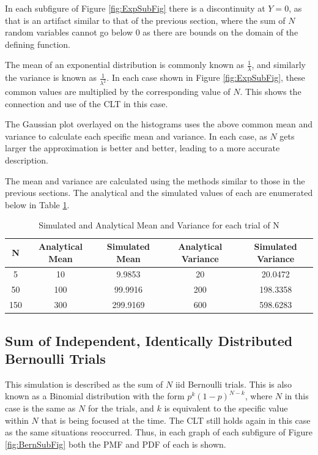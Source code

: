 \documentclass[a4paper, 11pt]{article}
\begin{document}
\noindent
In each subfigure of Figure \ref{fig:ExpSubFig} there is a discontinuity at \(Y = 0\), as that is an artifact similar to that of the previous section, where the sum of \(N\) random variables cannot go below \(0\) as there are bounds on the domain of the defining function.

\medskip
\noindent
The mean of an exponential distribution is commonly known as \(\displaystyle\frac{1}{\lambda}\), and similarly the variance is known as \(\displaystyle\frac{1}{\lambda^2}\). In each case shown in Figure \ref{fig:ExpSubFig}, these common values are multiplied by the corresponding value of \(N\).
This shows the connection and use of the CLT in this case.

\medskip
\noindent
The Gaussian plot overlayed on the histograms uses the above common mean and variance to calculate each specific mean and variance. In each case, as \(N\) gets larger the approximation is better and better, leading to a more accurate description.

\medskip
\noindent
The mean and variance are calculated using the methods similar to those in the previous sections. The analytical and the simulated values of each are enumerated below in Table \ref{tab:ExpTable}.

\begin{table}[htbp]
\caption{\label{tab:ExpTable}Simulated and Analytical Mean and Variance for each trial of N}
\centering
\begin{tabular}{|c|c|c|c|c|}
\hline
N & Analytical Mean & Simulated Mean & Analytical Variance & Simulated Variance\\
\hline
5 & 10 & 9.9853 & 20 & 20.0472\\
50 & 100 & 99.9916 & 200 & 198.3358\\
150 & 300 & 299.9169 & 600 & 598.6283\\
\hline
\end{tabular}
\end{table}



\subsection{Sum of Independent, Identically Distributed Bernoulli Trials}
\label{sec:org3bb145c}
This simulation is described as the sum of \(N\) iid Bernoulli trials. This is also known as a Binomial distribution with the form \(p^k(1-p)^{N-k}\), where \(N\) in this case is the same as \(N\) for the trials, and \(k\) is equivalent to the specific value within \(N\) that is being focused at the time.
The CLT still holds again in this case as the same situations reoccurred. Thus, in each graph of each subfigure of Figure \ref{fig:BernSubFig} both the PMF and PDF of each is shown.
\end{document}
